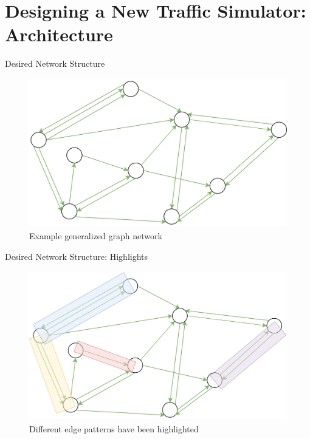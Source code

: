 \section{Designing a New Traffic Simulator:  Architecture}

    \frame{\sectionpage}
    
    \begin{frame}{Desired Network Structure}
        \begin{figure}
            \centering
            \includegraphics[height=6.5cm]{Images/Network_general.png}
            \caption{Example generalized graph network}
        \end{figure}
    \end{frame}
    
    
    \begin{frame}{Desired Network Structure: Highlights}
        \begin{figure}
            \centering
            \includegraphics[height=6.5cm]{Images/network_marked_up.png}
            \caption{Different edge patterns have been highlighted}
        \end{figure}
    \end{frame}
    
